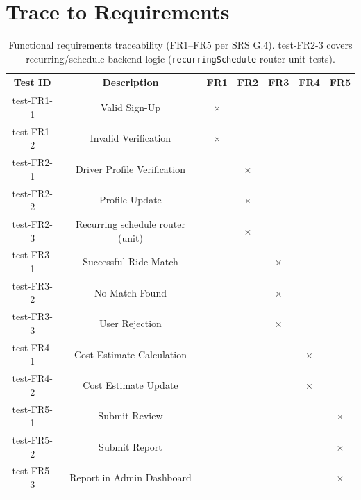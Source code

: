 \section{Trace to Requirements}

\begin{table}[H]
\centering
\begin{tabular}{|c|c|c|c|c|c|c|}
\hline
Test ID & Description & FR1 & FR2 & FR3 & FR4 & FR5 \\
\hline
test-FR1-1 & Valid Sign-Up & $\times$ & & & & \\
test-FR1-2 & Invalid Verification & $\times$ & & & & \\
\hline
test-FR2-1 & Driver Profile Verification & & $\times$ & & & \\
test-FR2-2 & Profile Update & & $\times$ & & & \\
test-FR2-3 & Recurring schedule router (unit) & & $\times$ & & & \\
\hline
test-FR3-1 & Successful Ride Match & & & $\times$ & & \\
test-FR3-2 & No Match Found & & & $\times$ & & \\
test-FR3-3 & User Rejection & & & $\times$ & & \\
\hline
test-FR4-1 & Cost Estimate Calculation & & & & $\times$ & \\
test-FR4-2 & Cost Estimate Update & & & & $\times$ & \\
\hline
test-FR5-1 & Submit Review & & & & & $\times$ \\
test-FR5-2 & Submit Report & & & & & $\times$ \\
test-FR5-3 & Report in Admin Dashboard & & & & & $\times$ \\
\hline

\end{tabular}
\caption{Functional requirements traceability (FR1--FR5 per SRS G.4). test-FR2-3 covers recurring/schedule backend logic (\texttt{recurringSchedule} router unit tests).}
\end{table}

